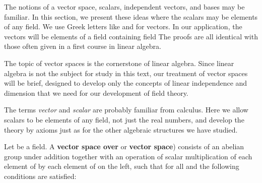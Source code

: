 \documentclass[11pt,oneside]{article}
\begin{document}
\fi
\renewcommand{\BookFooter}{Section 33 Vector Spaces}
\ifdefined\BookMaster\else\setcounter{page}{267}\fi

\BookNarrativetrue

\begin{BookBody}


\noindent The notions of a vector space, scalars, independent vectors, and bases may be familiar. In this section, we present these ideas where the scalars may be elements of any field. We use Greek letters like \BookInline{\alpha } and \BookInline{\beta } for vectors. In our application, the vectors will be elements of a field  containing field  The proofs are all identical with those often given in a first course in linear algebra.


\noindent The topic of vector spaces is the cornerstone of linear algebra. Since linear algebra is not the subject for study in this text, our treatment of vector spaces will be brief, designed to develop only the concepts of linear independence and dimension that we need for our development of field theory.

The terms\textit{ vector} and\textit{ scalar} are probably familiar from calculus. Here we allow scalars to be elements of any field, not just the real numbers, and develop the theory by axioms just as for the other algebraic structures we have studied.

 Let  be a field. A\textbf{ vector space over} or \textbf{vector space}) consists of an abelian group  under addition together with an operation of scalar multiplication of each element of  by each element of  on the left, such that for all  and  the following conditions are satisfied:



\end{BookBody}
\end{document}
